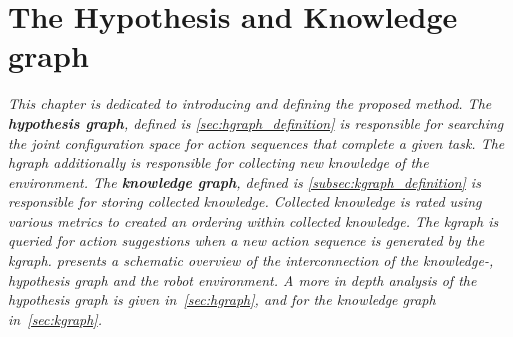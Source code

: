 \chapter{The Hypothesis and Knowledge graph}%
\label{chap:hgraph_and_kgraph}

\textit{This chapter is dedicated to introducing and defining the proposed method. The \textbf{hypothesis graph}, defined is \cref{sec:hgraph_definition} is responsible for searching the joint configuration space for action sequences that complete a given task. The \ac{hgraph} additionally is responsible for collecting new knowledge of the environment. The \textbf{knowledge graph}, defined is \cref{subsec:kgraph_definition} is responsible for storing collected knowledge. Collected knowledge is rated using various metrics to created an ordering within collected knowledge. The \ac{kgraph} is queried for action suggestions when a new action sequence is generated by the \ac{kgraph}.  presents a schematic overview of the interconnection of the knowledge-, hypothesis graph and the robot environment. A more in depth analysis of the hypothesis graph is given in~\cref{sec:hgraph}, and for the knowledge graph in~\cref{sec:kgraph}.}

